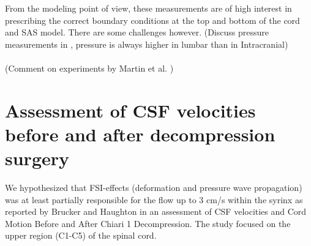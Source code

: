 From the modeling point of view, these measurements are of high interest in prescribing the correct boundary conditions at the top and bottom of the cord and SAS model. There are some challenges however. (Discuss pressure measurements in \cite{Fric15}, pressure is always higher in lumbar than in Intracranial)
\\
\\
(Comment on experiments by Martin et al. \cite{Mart09Syrinx})


\section{Assessment of CSF velocities before and after decompression surgery}
We hypothesized that FSI-effects (deformation and pressure wave propagation) was at least partially responsible for the flow up to 3 cm/s within the syrinx as reported by Brucker and Haughton in an assessment of CSF velocities and Cord Motion Before and After Chiari 1 Decompression. The study focused on the upper region (C1-C5) of the spinal cord.

